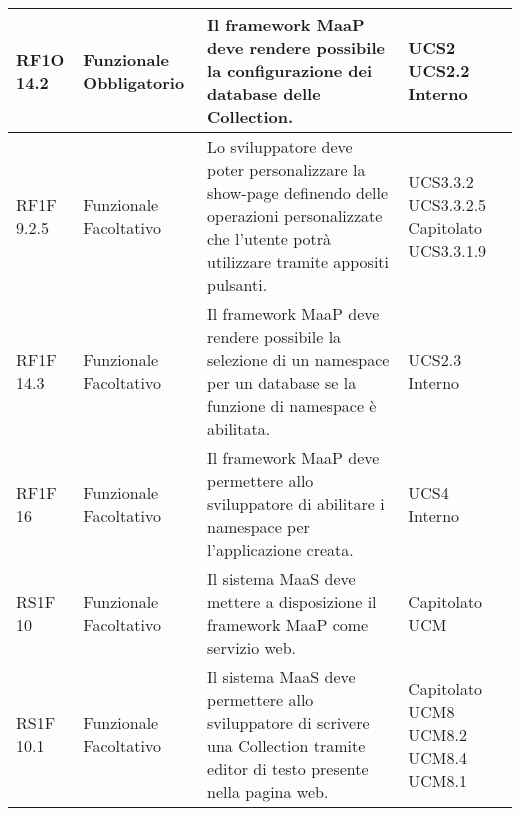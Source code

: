 \begin{center}
\begin{longtable}{ | l | p{2cm} | p{5cm} | p{1.7cm} |}
        RF1O 14.2 & Funzionale \newline  Obbligatorio  & Il framework MaaP deve rendere possibile la configurazione dei database delle Collection. &  UCS2 \newline  UCS2.2 \newline  Interno \newline  \\ \hline      
        RF1F 9.2.5 & Funzionale \newline  Facoltativo  & Lo sviluppatore deve poter personalizzare la show-page definendo delle operazioni personalizzate che l'utente potrà utilizzare tramite appositi pulsanti. &  UCS3.3.2 \newline  UCS3.3.2.5 \newline  Capitolato \newline  UCS3.3.1.9 \newline  \\ \hline      
        RF1F 14.3 & Funzionale \newline  Facoltativo  & Il framework MaaP deve rendere possibile la selezione di un namespace per un database se la funzione di namespace è abilitata. &  UCS2.3 \newline  Interno \newline  \\ \hline      
        RF1F 16 & Funzionale \newline  Facoltativo  & Il framework MaaP deve permettere allo sviluppatore di abilitare i namespace per l'applicazione creata. &  UCS4 \newline  Interno \newline  \\ \hline      
        RS1F 10 & Funzionale \newline  Facoltativo  & Il sistema MaaS deve mettere a disposizione il framework MaaP come servizio web. &  Capitolato \newline  UCM \newline  \\ \hline      
        RS1F 10.1 & Funzionale \newline  Facoltativo  & Il sistema MaaS deve permettere allo sviluppatore di scrivere una Collection tramite editor di testo presente nella pagina web. &  Capitolato \newline  UCM8 \newline  UCM8.2 \newline  UCM8.4 \newline  UCM8.1 \newline  \\ \hline      

\end{longtable}
\end{center}
